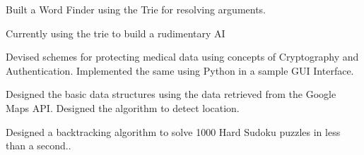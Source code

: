 \documentclass[]{deedy-resume-openfont}
\begin{document}
\begin{minipage}[t]{0.66\textwidth}
Built a Word Finder using the Trie for resolving arguments.\\ 
\item Currently using the trie to build a rudimentary AI\sectionsep

Devised schemes for protecting medical data using concepts of Cryptography and Authentication. Implemented the same using Python in a sample GUI Interface. 
\sectionsep


Designed the basic data structures using the data retrieved from the Google Maps API. Designed the algorithm to detect location. 
\sectionsep

Designed a backtracking algorithm to solve 1000 Hard Sudoku puzzles in less than a second.. 
\sectionsep






\end{minipage} 
\end{document}
